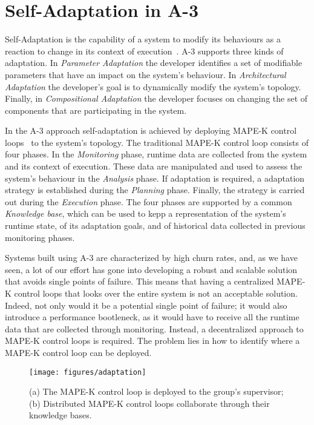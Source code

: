 
\section{Self-Adaptation in A-3}
\label{sec:selfAdaptation}

Self-Adaptation is the capability of a system to modify its behaviours as a reaction to change in its context of execution~\cite{Bruni1, Bruni2}. A-3 supports three kinds of adaptation. In \emph{Parameter Adaptation} the developer identifies a set of modifiable parameters that have an impact on the system's behaviour. In \emph{Architectural Adaptation} the developer's goal is to dynamically modify the system's topology. Finally, in \emph{Compositional Adaptation} the developer focuses on changing the set of components that are participating in the system. 

In the A-3 approach self-adaptation is achieved by deploying MAPE-K control loops~\cite{mape} to the system's topology. The traditional MAPE-K control loop consists of four phases. In the \emph{Monitoring} phase, runtime data are collected from the system and its context of execution. These data are manipulated and used to assess the system's behaviour in the \emph{Analysis} phase. If adaptation is required, a adaptation strategy is established during the \emph{Planning} phase. Finally, the strategy is carried out during the \emph{Execution} phase. The four phases are supported by a common \emph{Knowledge base}, which can be used to kepp a representation of the system's runtime state, of its adaptation goals, and of historical data collected in previous monitoring phases. 

Systems built using A-3 are characterized by high churn rates, and, as we have seen, a lot of our effort has gone into developing a robust and scalable solution that avoids single points of failure. This means that having a centralized MAPE-K control loops that looks over the entire system is not an acceptable solution. Indeed, not only would it be a potential single point of failure; it would also introduce a performance bootleneck, as it would have to receive all the runtime data that are collected through monitoring. Instead, a decentralized approach to MAPE-K control loops is required. The problem lies in how to identify where a MAPE-K control loop can be deployed.

\begin{figure}[tb]
	\begin{center}
		\texttt{[image: figures/adaptation]}
	\end{center}
	\caption{(a) The MAPE-K control loop is deployed to the group's supervisor; (b) Distributed MAPE-K control loops collaborate through their knowledge bases.}
	\label{fig:self-adaptation}
\end{figure}

